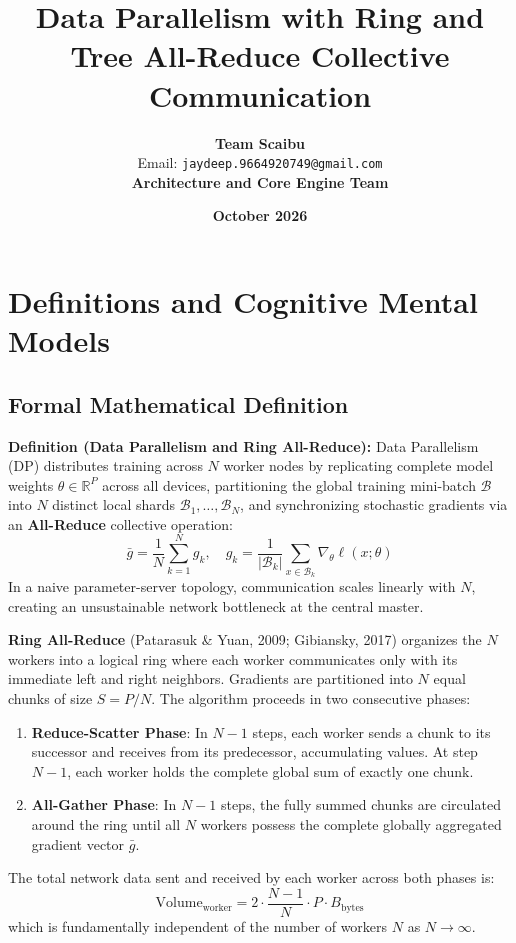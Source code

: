 \documentclass[11pt,a4paper]{article}
\title{\textbf{Data Parallelism with Ring and Tree All-Reduce Collective Communication}}
\author{\textbf{Team Scaibu} \\ \small Email: \texttt{jaydeep.9664920749@gmail.com} \\ \small \textbf{Architecture and Core Engine Team}}
\date{\textbf{October 2026}}
\theoremstyle{definition}
\begin{document}
\maketitle

\section{Definitions and Cognitive Mental Models}

\subsection{Formal Mathematical Definition}
\textbf{Definition (Data Parallelism and Ring All-Reduce):}
Data Parallelism (DP) distributes training across $N$ worker nodes by replicating complete model weights $\theta \in \mathbb{R}^P$ across all devices, partitioning the global training mini-batch $\mathcal{B}$ into $N$ distinct local shards $\mathcal{B}_1, \dots, \mathcal{B}_N$, and synchronizing stochastic gradients via an \textbf{All-Reduce} collective operation:
{\boldmath
\begin{equation}
\bar{g} = \frac{1}{N} \sum_{k=1}^N g_k, \quad g_k = \frac{1}{|\mathcal{B}_k|} \sum_{x \in \mathcal{B}_k} \nabla_\theta \ell(x; \theta)
\end{equation}
}
In a naive parameter-server topology, communication scales linearly with $N$, creating an unsustainable network bottleneck at the central master.

\textbf{Ring All-Reduce} (Patarasuk \& Yuan, 2009; Gibiansky, 2017) organizes the $N$ workers into a logical ring where each worker communicates only with its immediate left and right neighbors. Gradients are partitioned into $N$ equal chunks of size $S = P / N$. The algorithm proceeds in two consecutive phases:
\begin{enumerate}
    \item \textbf{Reduce-Scatter Phase}: In $N - 1$ steps, each worker sends a chunk to its successor and receives from its predecessor, accumulating values. At step $N-1$, each worker holds the complete global sum of exactly one chunk.
    \item \textbf{All-Gather Phase}: In $N - 1$ steps, the fully summed chunks are circulated around the ring until all $N$ workers possess the complete globally aggregated gradient vector $\bar{g}$.
\end{enumerate}
The total network data sent and received by each worker across both phases is:
{\boldmath
\begin{equation}
\text{Volume}_{\text{worker}} = 2 \cdot \frac{N - 1}{N} \cdot P \cdot B_{\text{bytes}}
\end{equation}
}
which is fundamentally independent of the number of workers $N$ as $N \to \infty$.
\end{document}
